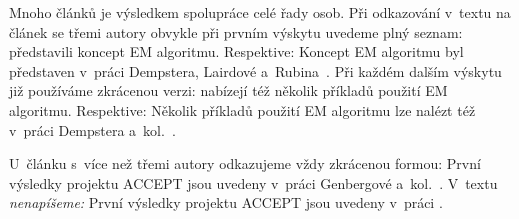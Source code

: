 Mnoho článků je výsledkem spolupráce celé řady osob. Při odkazování
v~textu na článek se třemi autory obvykle při prvním výskytu uvedeme
plný seznam: \citet*{DempsterLairdRubin77} představili koncept EM
algoritmu. Respektive: Koncept EM algoritmu byl představen v~práci
Dempstera, Lairdové a~Rubina~\cite{DempsterLairdRubin77}. Při každém
dalším výskytu již používáme zkrácenou verzi:
\citet{DempsterLairdRubin77} nabízejí též několik příkladů použití EM
algoritmu. Respektive: Několik příkladů použití EM algoritmu lze
nalézt též v~práci Dempstera a~kol.~\cite{DempsterLairdRubin77}.

U~článku s~více než třemi autory odkazujeme vždy zkrácenou formou:
První výsledky projektu ACCEPT jsou uvedeny v~práci Genbergové a~kol.~\cite{Genberget08}.
V~textu \emph{nenapíšeme:} První výsledky
projektu ACCEPT jsou uvedeny v~práci \citet*{Genberget08}.
